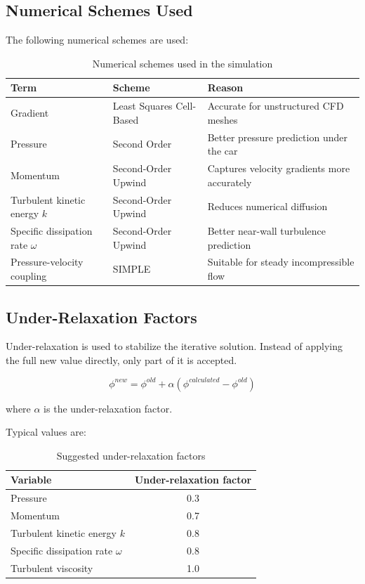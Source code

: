 \documentclass[12pt,a4paper]{article}
\begin{document}
\subsection{Numerical Schemes Used}

The following numerical schemes are used:

\begin{table}[H]
\centering
\caption{Numerical schemes used in the simulation}
\begin{tabular}{llp{6cm}}
\toprule
\textbf{Term} & \textbf{Scheme} & \textbf{Reason} \\
\midrule
Gradient & Least Squares Cell-Based & Accurate for unstructured CFD meshes \\
Pressure & Second Order & Better pressure prediction under the car \\
Momentum & Second-Order Upwind & Captures velocity gradients more accurately \\
Turbulent kinetic energy \(k\) & Second-Order Upwind & Reduces numerical diffusion \\
Specific dissipation rate \(\omega\) & Second-Order Upwind & Better near-wall turbulence prediction \\
Pressure-velocity coupling & SIMPLE & Suitable for steady incompressible flow \\
\bottomrule
\end{tabular}
\end{table}

\subsection{Under-Relaxation Factors}

Under-relaxation is used to stabilize the iterative solution. Instead of applying the full new value directly, only part of it is accepted.

\begin{equation}
    \phi^{new} = \phi^{old} + \alpha \left( \phi^{calculated} - \phi^{old} \right)
\end{equation}

where \(\alpha\) is the under-relaxation factor.

Typical values are:

\begin{table}[H]
\centering
\caption{Suggested under-relaxation factors}
\begin{tabular}{lc}
\toprule
\textbf{Variable} & \textbf{Under-relaxation factor} \\
\midrule
Pressure & 0.3 \\
Momentum & 0.7 \\
Turbulent kinetic energy \(k\) & 0.8 \\
Specific dissipation rate \(\omega\) & 0.8 \\
Turbulent viscosity & 1.0 \\
\bottomrule
\end{tabular}
\end{table}
\end{document}
